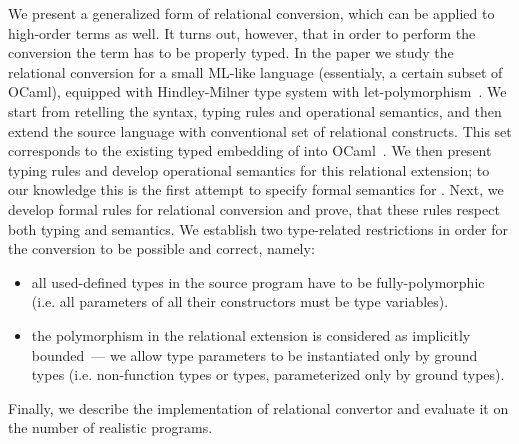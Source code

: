 We present a generalized form of relational conversion, which can be applied to high-order terms as well. It turns out, however, that
in order to perform the conversion the term has to be properly typed. In the paper we study the relational conversion for a small ML-like 
language (essentialy, a certain subset of OCaml), equipped with Hindley-Milner type system with let-polymorphism~\cite{Types}. 
We start from retelling the syntax, typing rules and operational semantics, and then extend the source language with conventional set of 
relational constructs. This set corresponds to the existing typed embedding of \miniKanren into OCaml~\cite{ocanren}. We then present typing rules and 
develop operational semantics for this relational extension; to our knowledge this is the first attempt to specify formal semantics for
\miniKanren. Next, we develop formal rules for relational conversion and prove, that these rules respect both typing and
semantics. We establish two type-related restrictions in order for the conversion to be possible and correct, namely:

\begin{itemize}
\item all used-defined types in the source program have to be fully-polymorphic (i.e. all parameters of all their constructors must be type variables).
\item the polymorphism in the relational extension is considered as implicitly bounded~--- we allow type parameters to be instantiated only
by ground types (i.e. non-function types or types, parameterized only by ground types).
\end{itemize}

Finally, we describe the implementation of relational convertor and evaluate it on the number of realistic programs.
